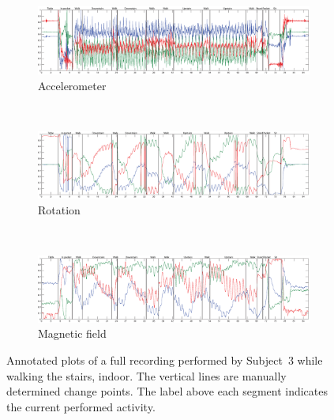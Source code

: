 \begin{figure}
  \centering
  \begin{subfigure}[b]{1\textwidth}
    \includegraphics[width=\textwidth]{./Figures/chapter6/data_collection/stairs-1-marc/data_plot_acc_annotated.eps}
    \caption{Accelerometer}
    \label{fig:data_gathering_run_7_acc}
  \end{subfigure} \\

  \begin{subfigure}[b]{1\textwidth}
    \includegraphics[width=\textwidth]{./Figures/chapter6/data_collection/stairs-1-marc/data_plot_rot_annotated.eps}
    \caption{Rotation}
    \label{fig:data_gathering_run_7_rot}
  \end{subfigure} \\

  \begin{subfigure}[b]{1\textwidth}
    \includegraphics[width=\textwidth]{./Figures/chapter6/data_collection/stairs-1-marc/data_plot_mag_annotated.eps}
    \caption{Magnetic field}
    \label{fig:data_gathering_run_7_mag}
  \end{subfigure}

  \caption[Plots subject 3]{Annotated plots of a full recording performed by Subject~$3$ while walking the stairs, indoor. The vertical lines are manually determined change points. The label above each segment indicates the current performed activity.}\label{fig:plots_subject_3}
\end{figure}